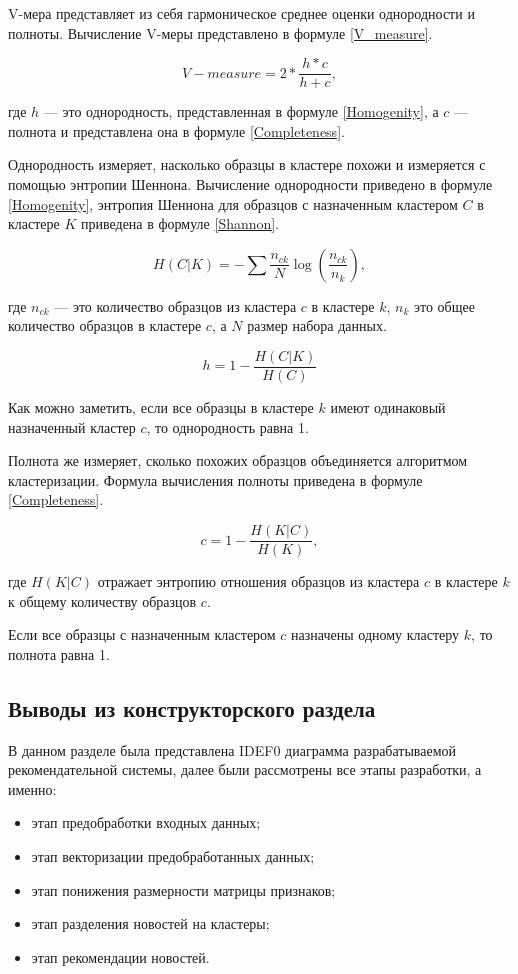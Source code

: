 V-мера представляет из себя гармоническое среднее оценки однородности и полноты. Вычисление V-меры представлено в формуле \ref{V_measure}.

\begin{equation}
\label{V_measure}
V-measure = 2 * \frac{h * c}{h + c},
\end{equation}

где $h$ --- это однородность, представленная в формуле \ref{Homogenity}, а $c$ --- полнота и представлена она в формуле \ref{Completeness}.

Однородность измеряет, насколько образцы в кластере похожи и измеряется с помощью энтропии Шеннона. Вычисление однородности приведено в формуле \ref{Homogenity}, энтропия Шеннона для образцов с назначенным кластером $C$ в кластере $K$ приведена в формуле \ref{Shannon}.

\begin{equation}
\label{Shannon}
H(C|K) = -\sum\frac{n_{ck}}{N}\log(\frac{n_{ck}}{n_k}),
\end{equation}

где $n_{ck}$ --- это количество образцов из кластера $c$ в кластере $k$, $n_k$ это общее количество образцов в кластере $c$, а $N$ размер набора данных.

\begin{equation}
\label{Homogenity}
h = 1 - \frac{H(C|K)}{H(C)}
\end{equation}

Как можно заметить, если все образцы в кластере $k$ имеют одинаковый назначенный кластер $c$, то однородность равна 1.

Полнота же измеряет, сколько похожих образцов объединяется алгоритмом кластеризации. Формула вычисления полноты приведена в формуле \ref{Completeness}.

\begin{equation}
\label{Completeness}
c = 1 - \frac{H(K|C)}{H(K)},
\end{equation}

где $H(K|C)$ отражает энтропию отношения образцов из кластера $c$ в кластере $k$ к общему количеству образцов $c$.

Если все образцы с назначенным кластером $c$ назначены одному кластеру $k$, то полнота равна 1.


\subsection{Выводы из конструкторского раздела}

В данном разделе была представлена IDEF0 диаграмма разрабатываемой рекомендательной системы, далее были рассмотрены все этапы разработки, а именно:
\begin{itemize}
	\item этап предобработки входных данных;
	\item этап векторизации предобработанных данных;
	\item этап понижения размерности матрицы признаков;
	\item этап разделения новостей на кластеры;
	\item этап рекомендации новостей.
\end{itemize}

